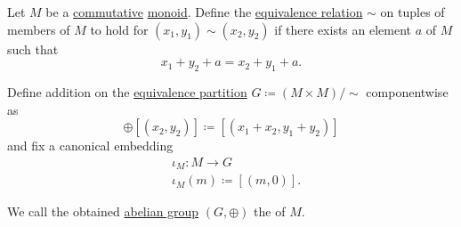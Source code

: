 \begin{definition}\label{def:monoid_completion}
  Let \( M \) be a \hyperref[def:magma/commutative]{commutative} \hyperref[def:monoid]{monoid}. Define the \hyperref[def:equivalence_relation]{equivalence relation} \( \sim \) on tuples of members of \( M \) to hold for \( (x_1, y_1) \sim (x_2, y_2) \) if there exists an element \( a \) of \( M \) such that
  \begin{equation*}
    x_1 + y_2 + a = x_2 + y_1 + a.
  \end{equation*}

  Define addition on the \hyperref[thm:equivalence_partition]{equivalence partition} \( G \coloneqq (M \times M) / \sim \) componentwise as
  \begin{equation*}
    [(x_1, y_1)] \oplus [(x_2, y_2)]
    \coloneqq
    [(x_1 + x_2, y_1 + y_2)]
  \end{equation*}
  and fix a canonical embedding
  \begin{equation*}
    \begin{aligned}
      &\iota_M: M \to G \\
      &\iota_M(m) \coloneqq [(m, 0)].
    \end{aligned}
  \end{equation*}

  We call the obtained \hyperref[def:abelian_group]{abelian group} \( (G, \oplus) \) the  of \( M \).
\end{definition}
